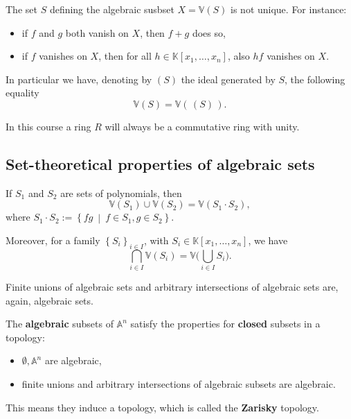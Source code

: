 \begin{rem}
	The set $S$ defining the algebraic susbset $X = \mathbb{V}(S)$ is not unique. For instance:
	\begin{itemize}
		\item if $f$ and $g$ both vanish on $X$, then $f + g$ does so,
		\item if $f$ vanishes on $X$, then for all $h \in \mathbb{K}[x_1, \ldots, x_n]$, also $hf$ vanishes on $X$.
	\end{itemize}
	In particular we have, denoting by $\left( S \right)$ the ideal generated by $S$, the following equality
	\begin{equation}
		\mathbb{V}(S) = \mathbb{V}\left(\, (S)  \,\right)
	.\end{equation} 
\end{rem}

\begin{rem}
	In this course a ring $R$ will always be a commutative ring with unity.
\end{rem}

\subsection{Set-theoretical properties of algebraic sets}

\begin{lem}
	If $S_1$ and $S_2$ are sets of polynomials, then
	\begin{equation}
		\mathbb{V}(S_1) \cup \mathbb{V}(S_2) = \mathbb{V}(S_1 \cdot S_2)
	,\end{equation} 
	where $S_1 \cdot S_2 := \left\{ fg \ \middle|\ f \in S_1, g \in S_2 \right\}$.

	Moreover, for a family $\left\{ S_i \right\}_{i \in I}$, with $S_i \in \mathbb{K} \left[x_1, \ldots, x_n \right]$, we have
	\begin{equation}
		\bigcap_{i \in I}\mathbb{V}(S_i) = \mathbb{V} \big( \bigcup_{i \in I}S_i \big)
	.\end{equation} 
\end{lem} 
\begin{cor}
	Finite unions of algebraic sets and arbitrary intersections of algebraic sets are, again, algebraic sets.
\end{cor} 

\begin{defn}
	The \textbf{algebraic} subsets of $\mathbb{A}^n$ satisfy the properties for \textbf{closed} subsets in a topology: 
	\begin{itemize}
		\item $\emptyset, \mathbb{A}^n$ are algebraic,
		\item finite unions and arbitrary intersections of algebraic subsets are algebraic.
	\end{itemize}
	This means they induce a topology, which is called the \textbf{Zarisky} topology.
\end{defn}

